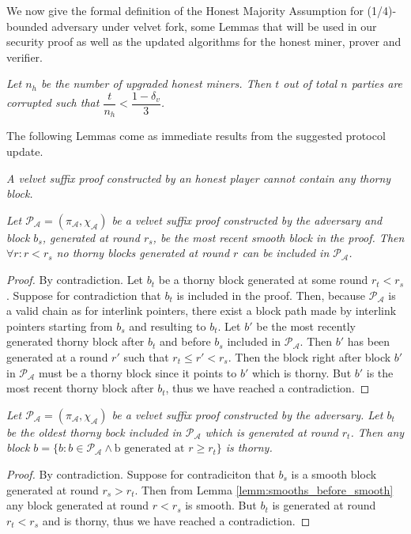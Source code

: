 We now give the formal definition of the Honest Majority Assumption for (1/4)-bounded adversary under velvet fork, some Lemmas that will be used in our security proof as well as the updated algorithms for the honest miner, prover and verifier.
\begin{definition}
	\textit{Let $n_h$ be the number of upgraded honest miners. Then $t$ out of total $n$ parties are corrupted such that $\dfrac{t}{n_h} < \dfrac{1 - \delta_v}{3} $.}
	\label{defn:velvet_honest_majority}
\end{definition}

The following Lemmas come as immediate results from the suggested protocol
update.\\

\begin{lemma}
	\textit{A velvet suffix proof constructed by an honest player cannot contain any thorny block.}
	\label{lemm:smooth_honest_suffix}
\end{lemma}

\begin{lemma}
	\textit{Let $\mathcal{P_A} = (\pi_\mathcal{A}, \chi_\mathcal{A})$ be a velvet suffix proof constructed by the adversary and block $b_s$, generated at round $r_s$, be the most recent smooth block in the proof. Then $\forall r:r < r_s$ no thorny blocks generated at round $r$ can be included in $\mathcal{P_A}$.}
	\label{lemm:smooths_before_smooth}
\end{lemma}
\begin{proof}
By contradiction. Let $b_t$ be a thorny block generated at some round $r_t < r_s$. Suppose for contradiction that $b_t$ is included in the proof. Then, because $\mathcal{P_A}$ is a valid chain as for interlink pointers, there exist a block path made by interlink pointers starting from $b_s$ and resulting to $b_t$. Let $b'$ be the most recently generated thorny block after $b_t$ and before $b_s$ included in $\mathcal{P_A}$. Then $b'$ has been generated at a round $r'$ such that $r_t \leq r' < r_s$. Then the block right after block $b'$ in $\mathcal{P_A}$ must be a thorny block since it points to $b'$ which is thorny. But $b'$ is the most recent thorny block after $b_t$, thus we have reached a contradiction.
\end{proof}

\begin{lemma}
	\textit{Let $\mathcal{P_A} = (\pi_\mathcal{A}, \chi_\mathcal{A})$ be a velvet suffix proof constructed by the adversary. Let $b_t$ be the oldest thorny bock included in $\mathcal{P_A}$ which is generated at round $r_t$. Then any block $b = \{b: b \in \mathcal{P_A} \wedge \text{b generated at }r \geq r_t \}$ is thorny.}
	\label{lemm:thorny_after_thorny}
\end{lemma}
\begin{proof}
By contradiction. Suppose for contradiciton that $b_s$ is a smooth block generated at round $r_s > r_t$. Then from Lemma \ref{lemm:smooths_before_smooth} any block generated at round $r < r_s$ is smooth. But $b_t$ is generated at round $r_t < r_s$ and is thorny, thus we have reached a contradiction.
\end{proof}

